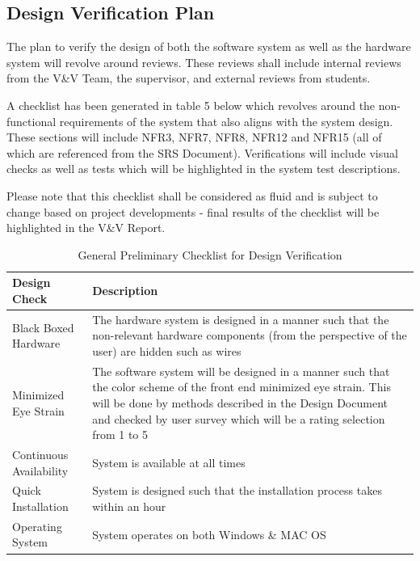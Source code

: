 \documentclass[12pt, titlepage]{article}
\begin{document}
\fancyhf{}
\fancyhead[C]{\thepage}
\renewcommand{\headrulewidth}{0pt}
\pagestyle{plain}


\subsection{Design Verification Plan}
The plan to verify the design of both the software system as well as the hardware system will revolve around reviews. These reviews shall include internal reviews from the V\&V Team, the supervisor, and external reviews from students. 
\par
A checklist has been generated in table 5 below which revolves around the non-functional requirements of the system that also aligns with the system design. These sections will include NFR3, NFR7, NFR8, NFR12 and NFR15 (all of which are referenced from the SRS Document). Verifications will include visual checks as well as tests which will be highlighted in the system test descriptions. 
\par 
Please note that this checklist shall be considered as fluid and is subject to change based on project developments - final results of the checklist will be highlighted in the V\&V Report. 

\begin{center}
\begin{table}[H]
    \centering
    \begin{tabular}{|p{5cm}|p{5cm}|}
    \hline
    Design Check & Description\\
    \hline
    Black Boxed Hardware & The hardware system is designed in a manner such that the non-relevant hardware components (from the perspective of the user) are hidden such as wires\\
    \hline
    Minimized Eye Strain & The software system will be designed in a manner such that the color scheme of the front end minimized eye strain. This will be done by methods described in the Design Document and checked by user survey which will be a rating selection from 1 to 5\\
    \hline
    Continuous Availability & System is available at all times\\
    \hline
    Quick Installation & System is designed such that the installation process takes within an hour\\
    \hline
    Operating System & System operates on both Windows \& MAC OS\\
    \hline
    \end{tabular}
    \caption{General Preliminary Checklist for Design Verification}
    \label{tab:my_label}
\end{table}
\end{center}
\end{document}
